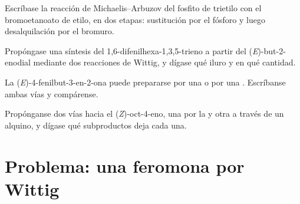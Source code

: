 \begin{exercise}[$\star\star$]\label{exo:b2:wittig:9}
Escríbase la reacción de Michaelis--Arbuzov del fosfito de trietilo con el bromoetanoato de etilo, en dos etapas:
sustitución por el fósforo y luego desalquilación por el bromuro.
\end{exercise}

\begin{exercise}[$\star\star\star$]\label{exo:b2:wittig:10}
Propóngase una síntesis del 1,6-difenilhexa-1,3,5-trieno a partir del (\textit{E})-but-2-enodial
 mediante dos reacciones de Wittig, y dígase qué iluro y en qué cantidad.
\end{exercise}

\begin{exercise}[$\star\star\star$]\label{exo:b2:wittig:11}
La (\textit{E})-4-fenilbut-3-en-2-ona puede prepararse por una  o por una .
Escríbanse ambas vías y compárense.
\end{exercise}

\begin{exercise}[$\star\star\star$]\label{exo:b2:wittig:12}
Propónganse dos vías hacia el (\textit{Z})-oct-4-eno, una por la  y otra a través de un alquino,
y dígase qué subproductos deja cada una.
\end{exercise}

\section{Problema: una feromona por Wittig}

